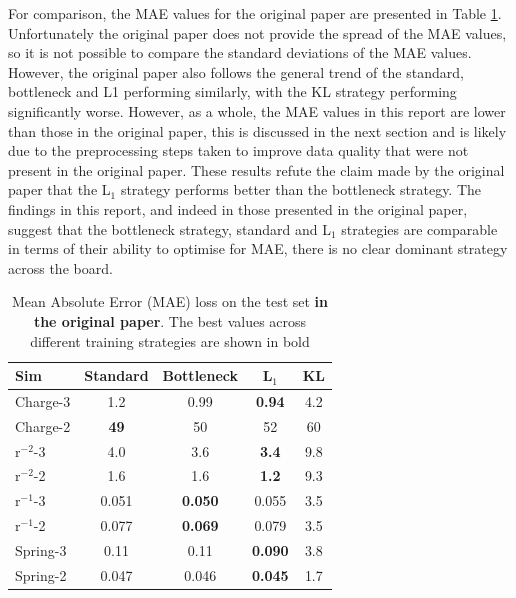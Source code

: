 \documentclass[11pt]{article}
\begin{document}
For comparison, the MAE values for the original paper are presented in Table \ref{tab:mae_table_original}. Unfortunately the original paper does not provide the spread of the MAE values, so it is not possible to compare the standard deviations of the MAE values. However, the original paper also follows the general trend of the standard, bottleneck and L1 performing similarly, with the KL strategy performing significantly worse. However, as a whole, the MAE values in this report are lower than those in the original paper, this is discussed in the next section and is likely due to the preprocessing steps taken to improve data quality that were not present in the original paper. These results refute the claim made by the original paper that the L$_1$ strategy performs better than the bottleneck strategy. The findings in this report, and indeed in those presented in the original paper, suggest that the bottleneck strategy, standard and L$_1$ strategies are comparable in terms of their ability to optimise for MAE, there is no clear dominant strategy across the board.

\begin{table}[H]
    \centering
    \begin{tabular}{lcccc}
    \hline
    Sim & Standard & Bottleneck & L$_1$ & KL \\
    \hline
    Charge-3 & 1.2  & 0.99  & \textbf{0.94}  & 4.2  \\
    Charge-2 & \textbf{49}  & 50  & 52  & 60  \\
    r$^{-2}$-3 & 4.0 & 3.6  & \textbf{3.4} & 9.8  \\
    r$^{-2}$-2 & 1.6  & 1.6  & \textbf{1.2}  & 9.3  \\
    r$^{-1}$-3 & 0.051 & \textbf{0.050}  & 0.055 & 3.5   \\
    r$^{-1}$-2 & 0.077  & \textbf{0.069}  & 0.079  & 3.5   \\
    Spring-3 & 0.11  & 0.11  & \textbf{0.090}  & 3.8  \\
    Spring-2 & 0.047  & 0.046  & \textbf{0.045}  & 1.7  \\
    \hline
    \end{tabular}
    \caption{Mean Absolute Error (MAE) loss on the test set \textbf{in the original paper}. The best values across different training strategies are shown in bold}
    \label{tab:mae_table_original}
    \end{table}
\end{document}
